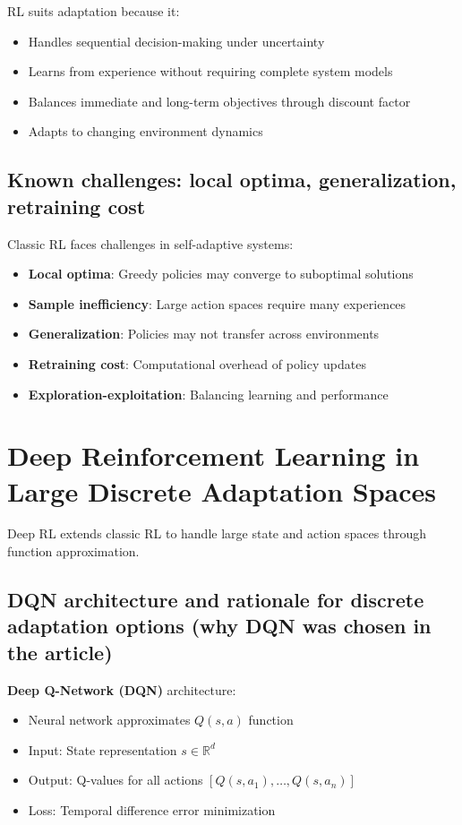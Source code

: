 \documentclass[11pt,a4paper]{article}
\begin{document}
RL suits adaptation because it:
\begin{itemize}
    \item Handles sequential decision-making under uncertainty
    \item Learns from experience without requiring complete system models
    \item Balances immediate and long-term objectives through discount factor
    \item Adapts to changing environment dynamics
\end{itemize}

\subsection{Known challenges: local optima, generalization, retraining cost}

Classic RL faces challenges in self-adaptive systems:

\begin{itemize}
    \item \textbf{Local optima}: Greedy policies may converge to suboptimal solutions
    \item \textbf{Sample inefficiency}: Large action spaces require many experiences
    \item \textbf{Generalization}: Policies may not transfer across environments
    \item \textbf{Retraining cost}: Computational overhead of policy updates
    \item \textbf{Exploration-exploitation}: Balancing learning and performance
\end{itemize}

\section{Deep Reinforcement Learning in Large Discrete Adaptation Spaces}

Deep RL extends classic RL to handle large state and action spaces through function approximation.

\subsection{DQN architecture and rationale for discrete adaptation options (why DQN was chosen in the article)}

\textbf{Deep Q-Network (DQN)} architecture:
\begin{itemize}
    \item Neural network approximates $Q(s,a)$ function
    \item Input: State representation $s \in \mathbb{R}^d$
    \item Output: Q-values for all actions $[Q(s,a_1), \ldots, Q(s,a_n)]$
    \item Loss: Temporal difference error minimization
\end{itemize}
\end{document}
